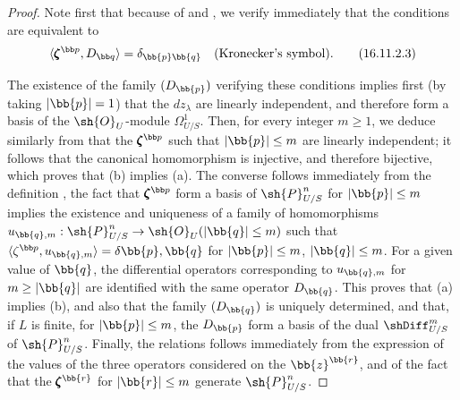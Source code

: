 \begin{proof}
Note first that because of  and , we verify immediately that the conditions  are equivalent to 
\[
  \label{IV.16.11.2.3}
  \langle \pmb{\zeta}^{\bb p}, D_{\bb q} \rangle = \delta_{\bb{p} \bb{q}} \quad (\text{Kronecker's symbol}).
  \tag{16.11.2.3}
\]

The existence of the family $(D_\bb{p})$ verifying these conditions implies first (by taking $|\bb{p}| = 1$) that the $dz_\lambda$ are linearly independent, and therefore form a basis of the $\sh{O}_U$-module $\Omega_{U/S}^1$.
Then, for every integer $m \geq 1$, we deduce similarly from  that the $\pmb{\zeta}^{\bb p}$ such that $|\bb{p}| \leq m$ are linearly independent;
it follows that the canonical homomorphism  is injective, and therefore bijective, which proves that (b) implies (a).
The converse follows immediately from the definition , the fact that $\pmb{\zeta}^{\bb p}$ form a basis of $\sh{P}_{U/S}^n$ for $|\bb{p}| \leq m$ implies the existence and uniqueness of a family of homomorphisms $u_{\bb{q}, m}: \sh{P}_{U/S}^n \to \sh{O}_U (|\bb{q}| \leq m)$ such that $\langle \zeta^{\bb p}, u_{\bb{q}, m} \rangle = \delta{\bb{p}, \bb{q}}$ for $|\bb{p}| \leq m$, $|\bb{q}| \leq m$.
For a given value of $\bb{q}$, the differential operators corresponding to $u_{\bb{q}, m}$ for $m \geq |\bb{q}|$ are identified with the same operator $D_\bb{q}$.
This proves that (a) implies (b), and also that the family $(D_\bb{q})$ is uniquely determined, and that, if $L$ is finite, for $|\bb{p}| \leq m$, the $D_\bb{p}$ form a basis of the dual $\shDiff_{U/S}^m$ of $\sh{P}_{U/S}^n$.
Finally, the relations  follows immediately from the expression of the values of the three operators considered on the $\bb{z}^\bb{r}$, and of the fact that the $\pmb{\zeta}^\bb{r}$ for $|\bb{r}| \leq m$ generate $\sh{P}_{U/S}^n$.
\end{proof}


